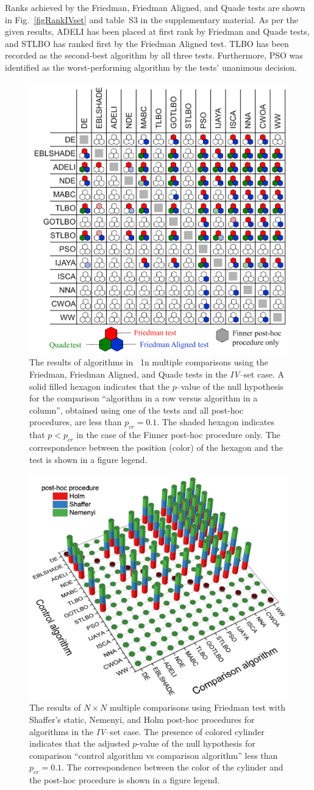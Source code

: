 \documentclass[a4paper,fleqn]{cas-sc}
\begin{document}
Ranks achieved by the Friedman, Friedman Aligned, and Quade tests are shown in Fig.~\ref{figRankIVset} and table~S3 in the supplementary material.
As per the given results, ADELI has been placed at first rank by Friedman and Quade tests,
and STLBO has ranked first by the Friedman Aligned test.
TLBO has been recorded as the second-best algorithm by all three tests.
Furthermore, PSO was identified as the worst-performing algorithm by the tests' unanimous decision.




\begin{figure}[]
	\centering
		\includegraphics[width=0.5\columnwidth]{Fig11}
	  \caption{
The results of algorithms in  1n multiple comparisons using the Friedman, Friedman Aligned, 
and Quade tests in the \emph{IV}--set case.
A solid filled hexagon indicates that the $p$--value of the null hypothesis for the comparison 
``algorithm in a row versus algorithm in a column'', obtained using one of the tests and all post-hoc procedures, 
are less than $p_{cr}=0.1$.
The shaded hexagon indicates that $p<p_{cr}$ in the case of the Finner post-hoc procedure only.
The correspondence between the position (color) of the hexagon and the test is shown in a figure legend.
               }\label{figN1RezIVset}
\end{figure}


\begin{figure}[]
	\centering
		\includegraphics[width=0.5\columnwidth]{Fig12}
	  \caption{
The results of $N\times N$ multiple comparisons using Friedman test
with Shaffer’s static, Nemenyi, and Holm post-hoc procedures for algorithms in the \emph{IV}--set case.
The presence of colored cylinder indicates that the adjusted $p$-value of the null hypothesis
for comparison ``control algorithm vs comparison algorithm'' less than $p_{cr}=0.1$.
The correspondence between the color of the cylinder and the post-hoc procedure is shown in a figure legend.
               }\label{figNNRezIVset}
\end{figure}
\end{document}

